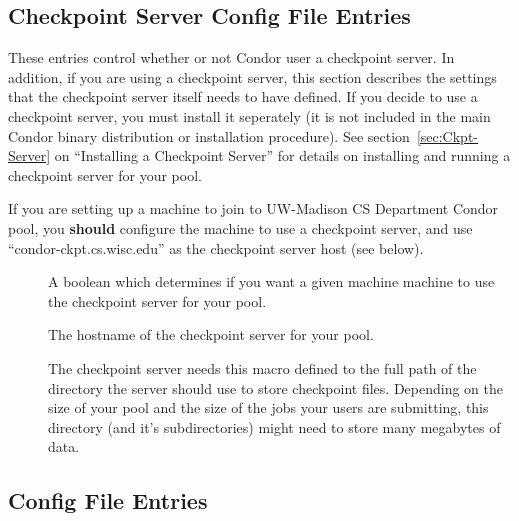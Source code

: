 \subsection{Checkpoint Server Config File Entries}
\label{sec:Checkpoint-Server-Config-File-Entries}

These entries control whether or not Condor user a checkpoint server.
In addition, if you are using a checkpoint server, this section
describes the settings that the checkpoint server itself needs to have
defined.  If you decide to use a checkpoint server, you must install
it seperately (it is not included in the main Condor binary
distribution or installation procedure).  See
section~\ref{sec:Ckpt-Server} on ``Installing a Checkpoint Server''
for details on installing and running a checkpoint server for your
pool.

\Note If you are setting up a machine to join to UW-Madison CS
Department Condor pool, you \textbf{should} configure the machine to
use a checkpoint server, and use ``condor-ckpt.cs.wisc.edu'' as the
checkpoint server host (see below).

\begin{description}
  
\item[] \label{param:UseCkptServer} A boolean
  which determines if you want a given machine machine to use the
  checkpoint server for your pool.  

\item[] \label{param:CkptServerHost} The
  hostname of the checkpoint server for your pool.  
  
\item[] \label{param:CkptServerDir} The
  checkpoint server needs this macro defined to the full path of the
  directory the server should use to store checkpoint files.
  Depending on the size of your pool and the size of the jobs your
  users are submitting, this directory (and it's subdirectories) might
  need to store many megabytes of data.

\end{description}


\subsection{ Config File Entries}
\label{sec:Master-Config-File-Entries}

